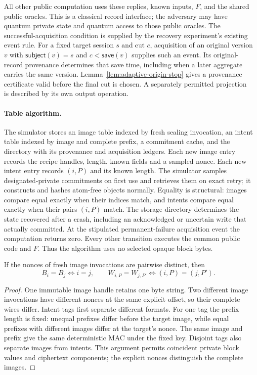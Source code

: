 All other public computation uses these replies, known inputs, $F$, and the
shared public oracles. This is a classical record interface; the adversary
may have quantum private state and quantum access to those public oracles.
The successful-acquisition condition is supplied by the recovery experiment's
existing event rule. For a fixed target session $s$ and cut $c$, acquisition
of an original version $v$ with $\mathsf{subject}(v)=s$ and
$c<\mathsf{save}(v)$ supplies such an event. Its original-record provenance
determines that save time, including when a later aggregate carries the same
version. Lemma~\ref{lem:adaptive-origin-stop} gives a provenance certificate
valid before the final cut is chosen. A separately permitted projection is
described by its own output operation.

\paragraph{Table algorithm.}
The simulator stores an image table indexed by fresh sealing invocation,
an intent table indexed by image and complete prefix, a commitment cache,
and the directory with its provenance and acquisition ledgers. Each new
image entry records the recipe handles, length, known fields and a sampled
nonce. Each new intent entry records $(i,P)$ and its known length. The
simulator samples designated-private commitments on first use and retrieves
them on exact retry; it constructs and hashes atom-free objects normally.
Equality is structural: images compare equal exactly when their indices
match, and intents compare equal exactly when their pairs $(i,P)$ match.
The storage directory determines the state recovered after a crash, including
an acknowledged or uncertain write that actually committed. At the stipulated
permanent-failure acquisition event the computation returns zero. Every other
transition executes the common public code and $F$. Thus the algorithm uses
no selected opaque block bytes.

\begin{lemma}
\label{lem:record-structural-equality}
If the nonces of fresh image invocations are pairwise distinct, then
\[
 B_i=B_j\iff i=j,\qquad
 W_{i,P}=W_{j,P'}\iff(i,P)=(j,P').
\]
\end{lemma}
\begin{proof}
One immutable image handle retains one byte string. Two different image
invocations have different nonces at the same explicit offset, so their
complete wires differ. Intent tags first separate different formats. For
one tag the prefix length is fixed: unequal prefixes differ before the
target image, while equal prefixes with different images differ at the
target's nonce. The same image and prefix give the same deterministic MAC
under the fixed key. Disjoint tags also separate images from intents.
This argument permits coincident private block values and ciphertext
components; the explicit nonces distinguish the complete images.
\end{proof}

